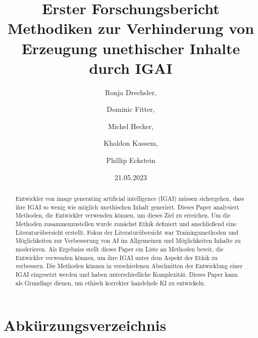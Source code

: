 \documentclass[12pt]{report}
\title{Erster Forschungsbericht \\[1ex] \large Methodiken zur Verhinderung von  Erzeugung unethischer Inhalte durch IGAI}
\date{21.05.2023}
\author{Ronja Drechsler, \and Dominic Fitter, \and Michel Hecker, \and Khaldon Kassem, \and Phillip Eckstein}
\begin{document}
\maketitle
\tableofcontents
\newpage

\section*{Abkürzungsverzeichnis}
\begin{acronym}[Abkürzungsverzeichnis]
	
\end{acronym}
\newpage

\begin{abstract}
	Entwickler von image generating artificial intelligence (IGAI) müssen sichergehen, dass ihre IGAI so wenig wie möglich unethischen Inhalt generiert.
	Dieses Paper analysiert Methoden, die Entwickler verwenden können, um dieses Ziel zu erreichen. 
	Um die Methoden zusammenzustellen wurde zunächst Ethik definiert und anschließend eine Literaturübersicht erstellt. 
	Fokus der Literaturübersicht war Trainingsmethoden und Möglichkeiten zur Verbesserung von AI im Allgemeinen und Möglichkeiten Inhalte zu moderieren. 
	Als Ergebniss stellt dieses Paper ein Liste an Methoden bereit, die Entwickler verwenden können, um ihre IGAI unter dem Aspekt der Ethik zu verbessern. 
	Die Methoden können in verschiedenen Abschnitten der Entwicklung einer IGAI eingesetzt werden und haben unterschiedliche Komplexität. 
	Dieses Paper kann als Grundlage dienen, um ethisch korrekter handelnde KI zu entwickeln.
\end{abstract}
\end{document}
